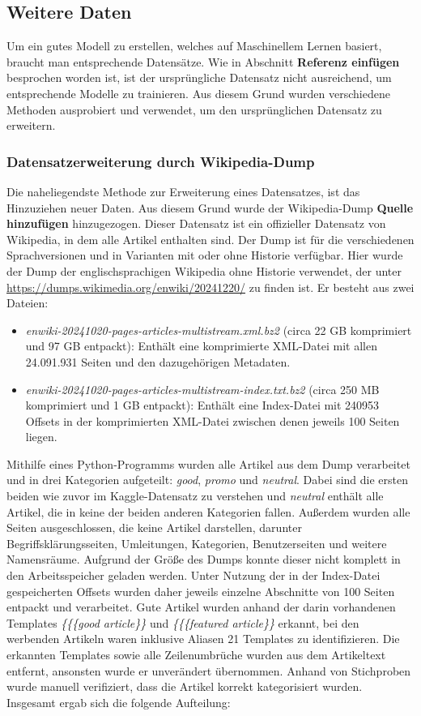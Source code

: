 \subsection{Weitere Daten}
Um ein gutes Modell zu erstellen, welches auf Maschinellem Lernen basiert, braucht man entsprechende Datensätze. Wie in Abschnitt \textbf{Referenz einfügen} besprochen worden ist, ist der ursprüngliche Datensatz nicht ausreichend, um entsprechende Modelle zu trainieren. Aus diesem Grund wurden verschiedene Methoden ausprobiert und verwendet, um den ursprünglichen Datensatz zu erweitern.

\subsubsection{Datensatzerweiterung durch Wikipedia-Dump}
Die naheliegendste Methode zur Erweiterung eines Datensatzes, ist das Hinzuziehen neuer Daten. Aus diesem Grund wurde der Wikipedia-Dump \textbf{Quelle hinzufügen} hinzugezogen. Dieser Datensatz ist ein offizieller Datensatz von Wikipedia, in dem alle Artikel enthalten sind. Der Dump ist für die verschiedenen Sprachversionen und in Varianten mit oder ohne Historie verfügbar. Hier wurde der Dump der englischsprachigen Wikipedia ohne Historie verwendet, der unter \url{https://dumps.wikimedia.org/enwiki/20241220/} zu finden ist. Er besteht aus zwei Dateien:
\begin{itemize}
    \item \emph{enwiki-20241020-pages-articles-multistream.xml.bz2} (circa 22 GB komprimiert und 97 GB entpackt): Enthält eine komprimierte XML-Datei mit allen 24.091.931 Seiten und den dazugehörigen Metadaten.
    \item \emph{enwiki-20241020-pages-articles-multistream-index.txt.bz2} (circa 250 MB komprimiert und 1 GB entpackt): Enthält eine Index-Datei mit 240953 Offsets in der komprimierten XML-Datei zwischen denen jeweils 100 Seiten liegen.
\end{itemize}
Mithilfe eines Python-Programms wurden alle Artikel aus dem Dump verarbeitet und in drei Kategorien aufgeteilt: \emph{good}, \emph{promo} und \emph{neutral}. Dabei sind die ersten beiden wie zuvor im Kaggle-Datensatz zu verstehen und \emph{neutral} enthält alle Artikel, die in keine der beiden anderen Kategorien fallen. Außerdem wurden alle Seiten ausgeschlossen, die keine Artikel darstellen, darunter Begriffsklärungsseiten, Umleitungen, Kategorien, Benutzerseiten und weitere Namensräume. Aufgrund der Größe des Dumps konnte dieser nicht komplett in den Arbeitsspeicher geladen werden. Unter Nutzung der in der Index-Datei gespeicherten Offsets wurden daher jeweils einzelne Abschnitte von 100 Seiten entpackt und verarbeitet. Gute Artikel wurden anhand der darin vorhandenen Templates \textit{\{\{\{good article\}\}} und \textit{\{\{\{featured article\}\}} erkannt, bei den werbenden Artikeln waren inklusive Aliasen 21 Templates zu identifizieren. Die erkannten Templates sowie alle Zeilenumbrüche wurden aus dem Artikeltext entfernt, ansonsten wurde er unverändert übernommen. Anhand von Stichproben wurde manuell verifiziert, dass die Artikel korrekt kategorisiert wurden. Insgesamt ergab sich die folgende Aufteilung:
